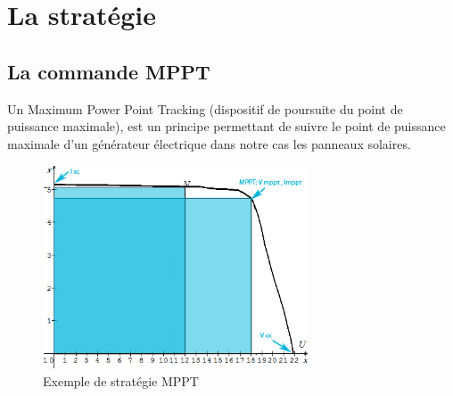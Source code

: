  
\section{La stratégie}

\subsection{La commande MPPT}
Un Maximum Power Point Tracking (dispositif de poursuite du point de puissance maximale), est un principe permettant de suivre le point de puissance maximale d'un générateur électrique dans notre cas les panneaux solaires.

\begin{figure}[ht]
	\begin{center}
	\includegraphics[width=0.7\textwidth]{images/MPPT.png}
	\caption{Exemple de stratégie MPPT}\label{img:courbe MPPT}
	\end{center}
\end{figure}
\FloatBarrier 

